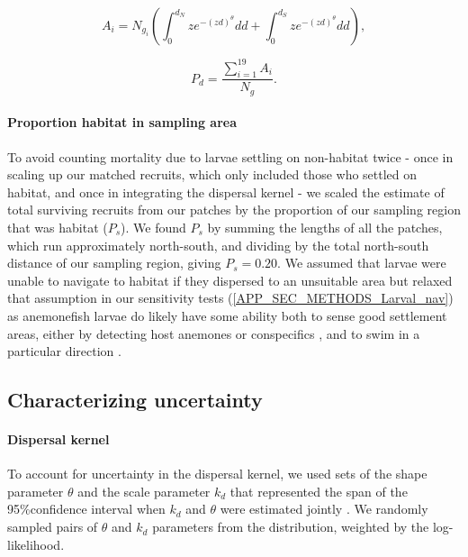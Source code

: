 \documentclass[12pt, oneside]{article}   	%
\begin{document}
\begin{equation} 
A_i = N_{g_i} \left( \int_{0}^{d_N} z e^{-(zd)^\theta}  dd + \int_{0}^{d_S} z e^{-(zd)^\theta}  dd \right), \label{EQN_DK_area_within_sampling_region}
\end{equation}

\begin{equation}
P_d = \frac{\sum_{i=1}^{19} A_i}{N_g}.
\end{equation}

\paragraph{Proportion habitat in sampling area} \label{APP_SEC_PropHabInSampledRegion}

To avoid counting mortality due to larvae settling on non-habitat twice - once in scaling up our matched recruits, which only included those who settled on habitat, and once in integrating the dispersal kernel - we scaled the estimate of total surviving recruits from our patches by the proportion of our sampling region that was habitat ($P_s$). We found $P_s$ by summing the lengths of all the patches, which run approximately north-south, and dividing by the total north-south distance of our sampling region, giving $P_s = 0.20$. We assumed that larvae were unable to navigate to habitat if they dispersed to an unsuitable area but relaxed that assumption in our sensitivity tests (\ref{APP_SEC_METHODS_Larval_nav}) as anemonefish larvae do likely have some ability both to sense good settlement areas, either by detecting host anemones \citep{elliott1995host, arvedlund1999host} or conspecifics \citep[e.g.][for coral reef fish more broadly]{lecchini2005experimental}, and to swim in a particular direction \citep[e.g.][]{bellwood2001relative, fisher2005swimming}.


\subsection{Characterizing uncertainty} \label{APP_SEC_Uncertainty}

\paragraph{Dispersal kernel} \label{APP_SEC_Uncertainty_Dispersal}

To account for uncertainty in the dispersal kernel, we used sets of the shape parameter $\theta$ and the scale parameter $k_d$ that represented the span of the 95\%confidence interval when $k_d$ and $\theta$ were estimated jointly \citep[Table \ref{APP_TAB_Params},][]{catalanoInPrepconnectivity}. We randomly sampled pairs of $\theta$ and $k_d$ parameters from the distribution, weighted by the log-likelihood.
\end{document}
